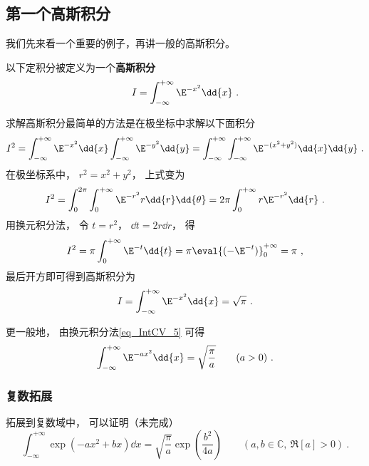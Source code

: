

\subsection{第一个高斯积分}

我们先来看一个重要的例子，再讲一般的高斯积分。

以下定积分被定义为一个\textbf{高斯积分}
\begin{equation}
I = \int_{-\infty}^{+\infty} \E^{-x^2}\dd{x}~.
\end{equation}

求解高斯积分最简单的方法是在极坐标中求解以下面积分
\begin{equation}
I^2 = \int_{-\infty}^{+\infty} \E^{-x^2}\dd{x} \int_{-\infty}^{+\infty} \E^{-y^2}\dd{y}
=\int_{-\infty}^{+\infty}\int_{-\infty}^{+\infty} \E^{-(x^2 + y^2)} \dd{x}\dd{y}~.
\end{equation}
在极坐标系中， $r^2 = x^2 + y^2$， 上式变为
\begin{equation}
I^2 = \int_0^{2\pi} \int_0^{+\infty} \E^{-r^2} r\dd{r}\dd{\theta}
= 2\pi \int_0^{+\infty} r\E^{-r^2} \dd{r}~.
\end{equation}
用换元积分法， 令 $t = r^2$， $\dd{t} = 2r\dd{r}$， 得
\begin{equation}
I^2 = \pi \int_0^{+\infty} \E^{-t} \dd{t} = \pi \eval{(-\E^{-t})}_0^{+\infty} = \pi~,
\end{equation}
最后开方即可得到高斯积分为
\begin{equation}\label{eq_GsInt_1}
I = \int_{-\infty}^{+\infty} \E^{-x^2}\dd{x} = \sqrt{\pi}~.
\end{equation}

更一般地， 由换元积分法\autoref{eq_IntCV_5}  可得
\begin{equation}\label{eq_GsInt_5}
\int_{-\infty}^{+\infty} \E^{-a x^2}\dd{x} = \sqrt{\frac{\pi}{a}} \qquad (a > 0)~.
\end{equation}

\subsubsection{复数拓展}
拓展到复数域中， 可以证明（未完成）
\begin{equation}\label{eq_GsInt_4}
\int_{-\infty}^{+\infty} \exp(-ax^2 + bx) \dd{x} = \sqrt{\frac{\pi}{a}} \exp(\frac{b^2}{4a}) \qquad (a, b\in \mathbb C,\ \Re[a] > 0)~.
\end{equation}


